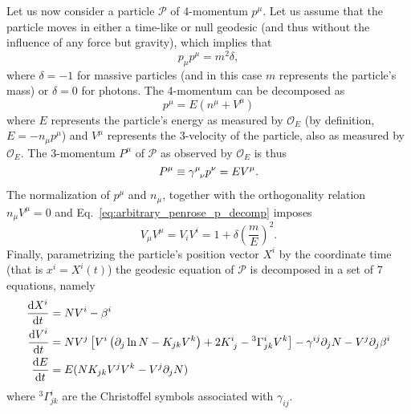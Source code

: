 Let us now consider a particle $\mathcal{P}$ of 4-momentum $p^\mu$. Let us assume that the particle moves in either a time-like or null geodesic (and thus without the influence of any force but gravity), which implies that
%
\begin{equation}
  p_\mu p^\mu = m^2\delta,
  \label{eq:arbitrary_penrose_p_norm}
\end{equation}
% 
where $\delta = -1$ for massive particles (and in this case $m$ represents the particle's mass) or $\delta=0$ for photons. The 4-momentum can be decomposed as
%
\begin{equation}
  p^\mu = E(n^\mu + V^\mu)
  \label{eq:arbitrary_penrose_p_decomp}
\end{equation}
%
where $E$ represents the particle's energy as measured by $\mathcal{O}_E$ (by definition,  $E = - n_\mu p^\mu$) and $V^\mu$ represents the 3-velocity of the particle, also as measured by $\mathcal{O}_E$. The 3-momentum $P^\mu$ of $\mathcal{P}$ as observed by $\mathcal{O}_E$ is thus
%
\begin{equation}
  P^\mu \equiv \tens{\gamma}{\mu}{\nu} p^\nu = E V^\mu.
  \label{eq:arbitrary_penrose_3_momentum}
\end{equation}
%
The normalization of $p^\mu$ and $n_\mu$, together with the orthogonality relation $n_\mu V^\mu = 0$ and Eq.~\eqref{eq:arbitrary_penrose_p_decomp} imposes
%
\begin{equation}
  V_\mu V^\mu = V_i V^i  = 1 + \delta\left(\frac{m}{E}\right)^2.
  \label{eq:arbitrary_penrose_V_norm}
\end{equation}
%
Finally, parametrizing the particle's position vector $X^i$ by the coordinate time (that is $x^i = X^i(t)$) the geodesic equation of $\mathcal{P}$ is decomposed in a set of 7 equations, namely
%
\begin{align}
  \der{X^i}{t} & = N V^i - \beta^i \label{eq:arbitrary_penrose_geodesic_eq_X}                                                                                                                                                  \\
  \der{V^i}{t} & = N V^j\left[ V^i \left( \partial_j \ln N - K_{jk} V^k \right) + 2 \tens{K}{i}{j} - {}^3\Gamma^{i}_{jk}V^k\right] - \gamma^{ij}\partial_j N - V^j\partial_j\beta^i \label{eq:arbitrary_penrose_geodesic_eq_V} \\
  \der{E}{t}   & = E (N K_{jk} V^j V^k - V^j \partial_j N) \label{eq:arbitrary_penrose_geodesic_eq_E}
\end{align}
%
where ${}^3\Gamma^{i}_{jk}$ are the Christoffel symbols associated with $\gamma_{ij}$.

